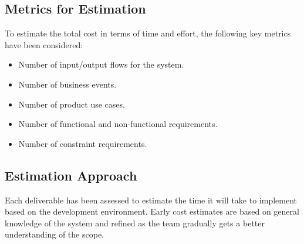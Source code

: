 \documentclass[12pt]{article}
\begin{document}
\subsection{Metrics for Estimation}
To estimate the total cost in terms of time and effort, the following key metrics have been considered:
\begin{itemize}
    \item Number of input/output flows for the system.
    \item Number of business events.
    \item Number of product use cases.
    \item Number of functional and non-functional requirements.
    \item Number of constraint requirements.
\end{itemize}

\subsection{Estimation Approach}
Each deliverable has been assessed to estimate the time it will take to implement based on the development environment. Early cost estimates are based on general knowledge of the system and refined as the team gradually gets a better understanding of the scope.
\end{document}
